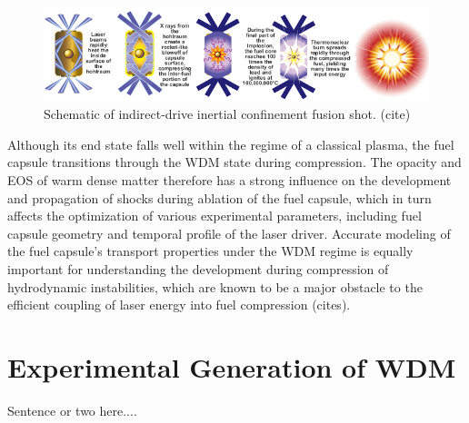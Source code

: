 \begin{figure}[h] \label{fig:icf}
\caption{Schematic of indirect-drive inertial confinement fusion shot. (cite)}
\centering
\includegraphics[scale=0.5]{../Figures/indirect-drive.jpg}
\end{figure}

Although its end state falls well within the regime of a classical plasma, the fuel capsule transitions through the WDM state during compression. The opacity and EOS of warm dense matter therefore has a strong influence on the development and propagation of shocks during ablation of the fuel capsule, which in turn affects the optimization of various experimental parameters, including fuel capsule geometry and temporal profile of the laser driver. Accurate modeling of the fuel capsule's transport properties under the WDM regime is equally important for understanding the development during compression of hydrodynamic instabilities, which are known to be a major obstacle to the efficient coupling of laser energy into fuel compression (cites).

\section{Experimental Generation of WDM}
Sentence or two here.... 
